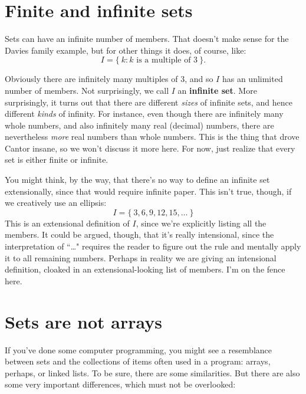 \section{Finite and infinite sets}

  Sets can have an infinite
number of members. That doesn't make sense for the Davies family example,
but for other things it does, of course, like:
\[
I = \{~k : \text{$k$ is a multiple of 3}~\}.
\]

Obviously there are infinitely many multiples of 3, and so $I$ has an
unlimited number of members. Not surprisingly, we call $I$ an \textbf{infinite
set}. More surprisingly, it turns out that there are different \textit{sizes}
of infinite sets, and hence different \textit{kinds} of infinity. For
instance, even though there are infinitely many whole numbers, and also
infinitely many real (decimal) numbers, there are nevertheless \textit{more}
real numbers than whole numbers. This is the thing that drove Cantor insane,
so we won't discuss it more here. For now, just realize that every set is
either finite or infinite. 

You might think, by the way, that there's no way to define an infinite set
extensionally, since that would require infinite paper. This isn't true,
though, if we creatively use an ellipsis: 
\[
I = \{~3,6,9,12,15,\dots~\}
\]
This is an extensional definition of $I$, since we're explicitly listing
all the members. It could be argued, though, that it's really intensional,
since the interpretation of ``\dots" requires the reader to figure out the
rule and mentally apply it to all remaining numbers. Perhaps in reality we
are giving an intensional definition, cloaked in an extensional-looking
list of members. I'm on the fence here.


\section{Sets are not arrays}

If you've done some computer programming, you might see a resemblance
between sets and the collections of items often used in a program: arrays,
perhaps, or linked lists.   To be sure,
there are some similarities. But there are also some very important
differences, which must not be overlooked:

